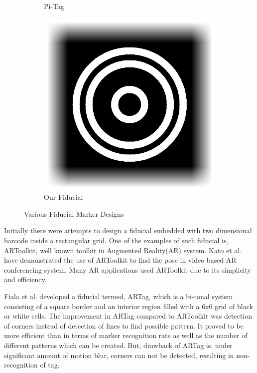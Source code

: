 \documentclass[runningheads]{llncs}
\begin{document}
\begin{figure}
\begin{subfigure}[b]{0.19\textwidth}
  Pi-Tag\cite{Pitag13}
 \end{subfigure}
 \begin{subfigure}[b]{0.19\textwidth}
  \centering
  \includegraphics[width=\linewidth]{our_fiducial}
  Our Fiducial
 \end{subfigure}
 \caption{Various Fiducial Marker Designs}
 \label{fig:previous_work}
\end{figure}

Initially there were attempts to design a fiducial embedded with two
dimensional barcode inside a rectangular grid. One of the examples of such fiducial is,
ARToolkit\cite{ARToolkit02}, well known toolkit in Augmented Reality(AR) system. 
Kato et al.\cite{kato-artoolkit} have demonstrated the use of ARToolkit to find
the pose in video based AR conferencing system. Many AR applications used
ARToolkit due to its simplicity and efficiency. 

Fiala et al. \cite{Fiala05} developed a fiducial termed, ARTag, which is a
bi-tonal system consisting of a square border and an interior region filled
with a 6x6 grid of black or white cells. The improvement in ARTag compared to
ARToolkit was detection of corners instead of detection of lines to find
possible pattern. It proved to be more efficient than \cite{ARToolkit02} in
terms of marker recognition rate as well as the number of different patterns
which can be created. But, drawback of ARTag is, under significant amount of
motion blur, corners can not be detected, resulting in non-recognition of tag.
\end{document}
